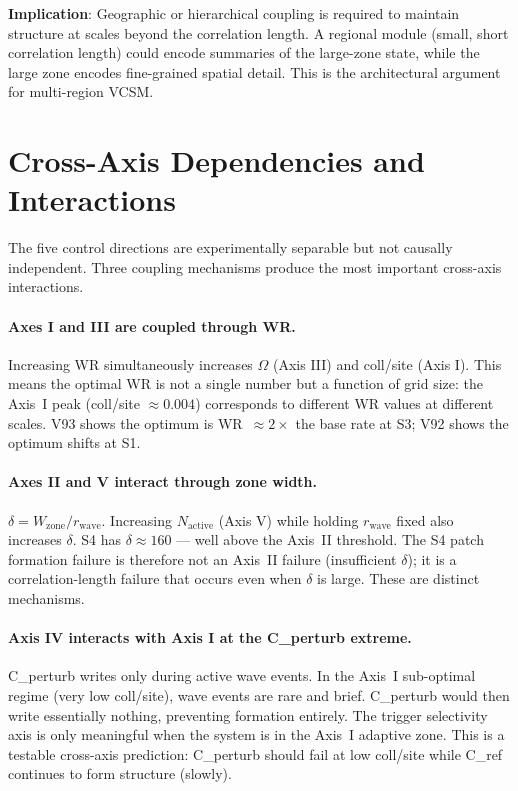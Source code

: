 \documentclass[11pt,a4paper]{article}
\begin{document}
\textbf{Implication}: Geographic or hierarchical coupling is required to
maintain structure at scales beyond the correlation length.
A regional module (small, short correlation length) could encode summaries of
the large-zone state, while the large zone encodes fine-grained spatial detail.
This is the architectural argument for multi-region VCSM.

\section{Cross-Axis Dependencies and Interactions}

The five control directions are experimentally separable but not causally
independent.
Three coupling mechanisms produce the most important cross-axis interactions.

\paragraph{Axes I and III are coupled through WR.}
Increasing WR simultaneously increases $\Omega$ (Axis III) and coll/site
(Axis I).
This means the optimal WR is not a single number but a function of grid size:
the Axis~I peak (coll/site $\approx 0.004$) corresponds to different WR values
at different scales.
V93 shows the optimum is WR~$\approx 2\times$ the base rate at S3; V92 shows
the optimum shifts at S1.

\paragraph{Axes II and V interact through zone width.}
$\delta = W_\text{zone}/r_\text{wave}$.
Increasing $N_\text{active}$ (Axis V) while holding $r_\text{wave}$ fixed also
increases $\delta$.
S4 has $\delta \approx 160$ --- well above the Axis~II threshold.
The S4 patch formation failure is therefore not an Axis~II failure (insufficient
$\delta$); it is a correlation-length failure that occurs even when $\delta$ is
large.
These are distinct mechanisms.

\paragraph{Axis IV interacts with Axis I at the C\_perturb extreme.}
C\_perturb writes only during active wave events.
In the Axis~I sub-optimal regime (very low coll/site), wave events are rare
and brief.
C\_perturb would then write essentially nothing, preventing formation entirely.
The trigger selectivity axis is only meaningful when the system is in the
Axis~I adaptive zone.
This is a testable cross-axis prediction: C\_perturb should fail at low
coll/site while C\_ref continues to form structure (slowly).
\end{document}
